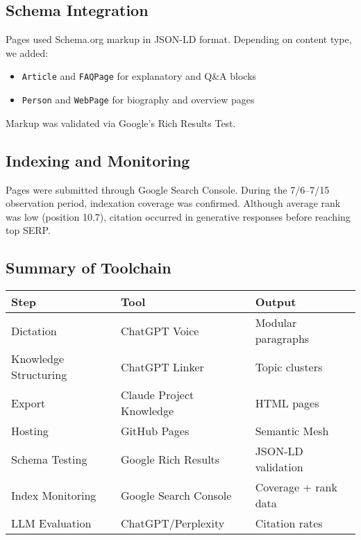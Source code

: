 \subsection{Schema Integration}

Pages used Schema.org markup in JSON-LD format. Depending on content type, we added:
\begin{itemize}
  \item \texttt{Article} and \texttt{FAQPage} for explanatory and Q\&A blocks
  \item \texttt{Person} and \texttt{WebPage} for biography and overview pages
\end{itemize}
Markup was validated via Google’s Rich Results Test.

\subsection{Indexing and Monitoring}

Pages were submitted through Google Search Console. During the 7/6--7/15 observation period, indexation coverage was confirmed. Although average rank was low (position 10.7), citation occurred in generative responses before reaching top SERP.

\subsection{Summary of Toolchain}

\begin{center}
\begin{tabular}{|l|l|l|}
\hline
\textbf{Step} & \textbf{Tool} & \textbf{Output} \\
\hline
Dictation & ChatGPT Voice & Modular paragraphs \\
Knowledge Structuring & ChatGPT Linker & Topic clusters \\
Export & Claude Project Knowledge & HTML pages \\
Hosting & GitHub Pages & Semantic Mesh \\
Schema Testing & Google Rich Results & JSON-LD validation \\
Index Monitoring & Google Search Console & Coverage + rank data \\
LLM Evaluation & ChatGPT/Perplexity & Citation rates \\
\hline
\end{tabular}
\end{center}
